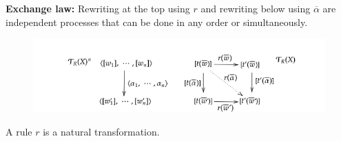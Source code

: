 \documentclass{beamer}
\begin{document}
\begin{frame}
    \textbf{Exchange law:} Rewriting at the top using $r$ and rewriting below using $\overline{\alpha}$
    are independent processes that can be done in any order or simultaneously.
    \pause
    \begin{figure}
        
        \includegraphics[width=\textwidth, height=\textheight,keepaspectratio]{img/nattr.png}
    \end{figure}
    \bigskip
   A rule $r$ is a natural transformation.



\end{frame}
\end{document}
